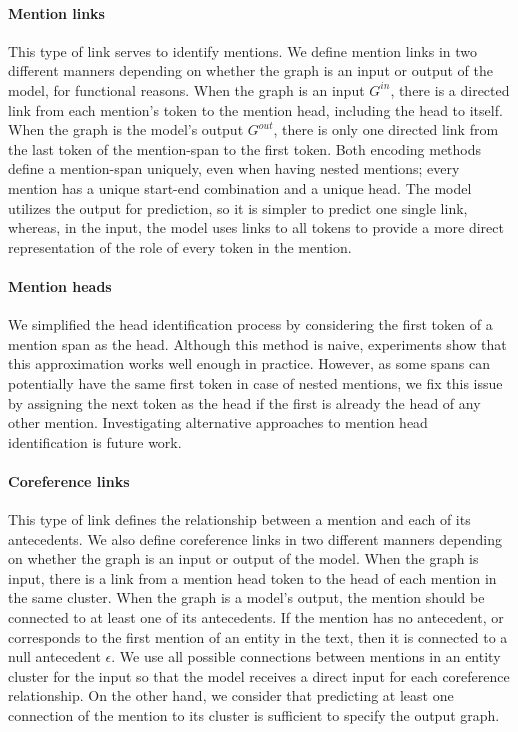 \documentclass[11pt]{article}
\begin{document}
\paragraph{Mention links} This type of link serves to identify mentions. 
We define mention links in two different manners depending on whether the graph is an input or output of the model, for functional reasons. When the graph is an input $G^{in}$, there is a directed link from each mention's token to the mention head, including the head to itself. 
When the graph is the model's output $G^{out}$, there is only one directed link from the last token of the mention-span to the first token. 
Both encoding methods define a mention-span uniquely, even when having nested mentions; every mention has a unique start-end combination and a unique head. The model utilizes the output for prediction, so it is simpler to predict one single link, whereas, in the input, the model uses links to all tokens to provide a more direct representation of the role of every token in the mention.
	
\paragraph{Mention heads} We simplified the head identification process by considering the first token of a mention span as the head. Although this method is naive, experiments show that this approximation works well enough in practice. However, as some spans can potentially have the same first token in case of nested mentions, we fix this issue by assigning the next token as the head if the first is already the head of any other mention. 
Investigating alternative approaches to mention head identification is future work.


\paragraph{Coreference links}  This type of link defines the relationship between a mention and each of its antecedents. We also define coreference links in two different manners depending on whether the graph is an input or output of the model. When the graph is input, there is a link from a mention head token to the head of each mention in the same cluster. 
When the graph is a model's output, the mention should be connected to at least one of its antecedents. If the mention has no antecedent, or corresponds to the first mention of an entity in the text, then it is connected to a null antecedent $\epsilon$. 
We use all possible connections between mentions in an entity cluster for the input so that the model receives a direct input for each coreference relationship. On the other hand, we consider that predicting at least one connection of the mention to its cluster is sufficient to specify the output graph.
\end{document}
